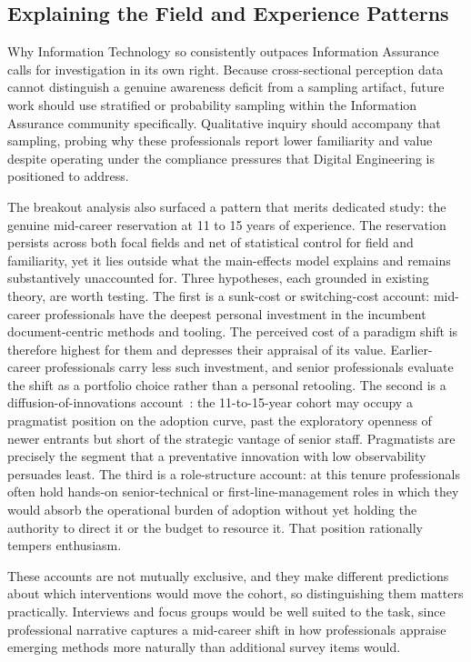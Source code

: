 \subsection{Explaining the Field and Experience Patterns}

Why Information Technology so consistently outpaces Information Assurance calls for investigation in its own right. Because cross-sectional perception data cannot distinguish a genuine awareness deficit from a sampling artifact, future work should use stratified or probability sampling within the Information Assurance community specifically. Qualitative inquiry should accompany that sampling, probing why these professionals report lower familiarity and value despite operating under the compliance pressures that Digital Engineering is positioned to address.

The breakout analysis also surfaced a pattern that merits dedicated study: the genuine mid-career reservation at 11 to 15 years of experience. The reservation persists across both focal fields and net of statistical control for field and familiarity, yet it lies outside what the main-effects model explains and remains substantively unaccounted for. Three hypotheses, each grounded in existing theory, are worth testing. The first is a sunk-cost or switching-cost account: mid-career professionals have the deepest personal investment in the incumbent document-centric methods and tooling. The perceived cost of a paradigm shift is therefore highest for them and depresses their appraisal of its value. Earlier-career professionals carry less such investment, and senior professionals evaluate the shift as a portfolio choice rather than a personal retooling. The second is a diffusion-of-innovations account~\parencite{Call_2024}: the 11-to-15-year cohort may occupy a pragmatist position on the adoption curve, past the exploratory openness of newer entrants but short of the strategic vantage of senior staff. Pragmatists are precisely the segment that a preventative innovation with low observability persuades least. The third is a role-structure account: at this tenure professionals often hold hands-on senior-technical or first-line-management roles in which they would absorb the operational burden of adoption without yet holding the authority to direct it or the budget to resource it. That position rationally tempers enthusiasm.

These accounts are not mutually exclusive, and they make different predictions about which interventions would move the cohort, so distinguishing them matters practically. Interviews and focus groups would be well suited to the task, since professional narrative captures a mid-career shift in how professionals appraise emerging methods more naturally than additional survey items would.

